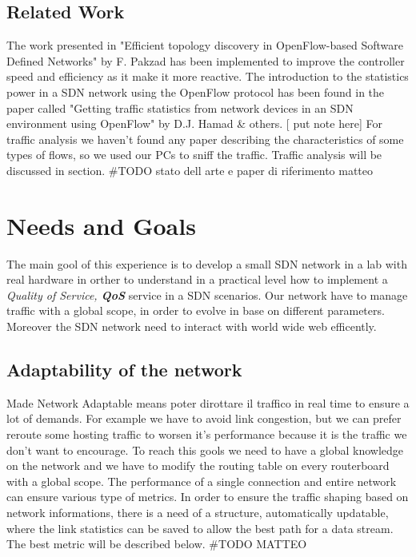 \documentclass[conference,10pt]{IEEEtran}
\begin{document}
  \subsection{Related Work}
  The work presented in 
"Efficient topology discovery in OpenFlow-based Software Defined Networks" by F. Pakzad \cite{farzaneh} 
has been implemented to improve the controller speed and efficiency as it make it more reactive.
The introduction to the statistics power in a SDN network using the OpenFlow protocol has been found 
in the paper called "Getting traffic statistics from network devices in an SDN environment using OpenFlow" by D.J. Hamad \& others. [ put note here]
For traffic analysis we haven't found any paper describing the characteristics of
some types of flows, so we used our PCs to sniff the traffic. Traffic analysis will be discussed in section.
  \#TODO stato dell arte e paper di riferimento  matteo

\section{Needs and Goals}\label{sec:obb} %
The main gool of this experience is to develop a small SDN network in a lab with real hardware
in orther to understand in a practical level how to implement a \textit{Quality of Service, \textbf{QoS}} service in a SDN scenarios.
Our network have to manage traffic with a global scope, in order to evolve in base on different parameters.
Moreover the SDN network need to interact with world wide web efficently.
  \subsection{Adaptability of the network}
  Made Network Adaptable means poter dirottare il traffico in real time to ensure a lot of demands. For example we have to avoid link congestion,
  but we can prefer reroute some hosting traffic to worsen it's performance because  it is the traffic we don't want to encourage.
  To reach this gools we need to have a global knowledge on the network and we have to modify the routing table on every routerboard with a
  global scope.
  The performance of a single connection and entire network can ensure various type of metrics.
  In order to ensure the traffic shaping based on network informations, there is a need of a structure, 
  automatically updatable, where the link statistics can be saved to allow the best path for a data stream. The best metric will be described below.
  \#TODO MATTEO
\end{document}
